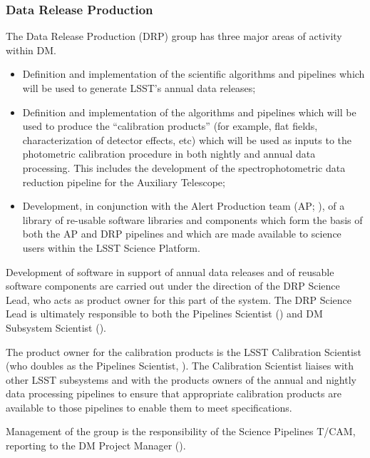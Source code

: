 \subsubsection{Data Release Production \label{sect:drp}}

The Data Release Production (DRP) group has three major areas of activity within DM.

\begin{itemize}

  \item{Definition and implementation of the scientific algorithms and pipelines which will be used to generate LSST's annual data releases;}

  \item{Definition and implementation of the algorithms and pipelines which will be used to produce the ``calibration products'' (for example, flat fields, characterization of detector effects, etc) which will be used as inputs to the photometric calibration procedure in both nightly and annual data processing. This includes the development of the spectrophotometric data reduction pipeline for the Auxiliary Telescope;}

  \item{Development, in conjunction with the Alert Production team (AP; ), of a library of re-usable software libraries and components which form the basis of both the AP and DRP pipelines and which are made available to science users within the LSST Science Platform.}

\end{itemize}

Development of software in support of annual data releases and of reusable software components are carried out under the direction of the DRP Science Lead, who acts as product owner for this part of the system.
The DRP Science Lead is ultimately responsible to both the Pipelines Scientist () and DM Subsystem Scientist ().

The product owner for the calibration products is the LSST Calibration Scientist (who doubles as the Pipelines Scientist, ).
The Calibration Scientist liaises with other LSST subsystems and with the products owners of the annual and nightly data processing pipelines to ensure that appropriate calibration products are available to those pipelines to enable them to meet specifications.

Management of the group is the responsibility of the Science Pipelines T/CAM, reporting to the DM Project Manager ().

